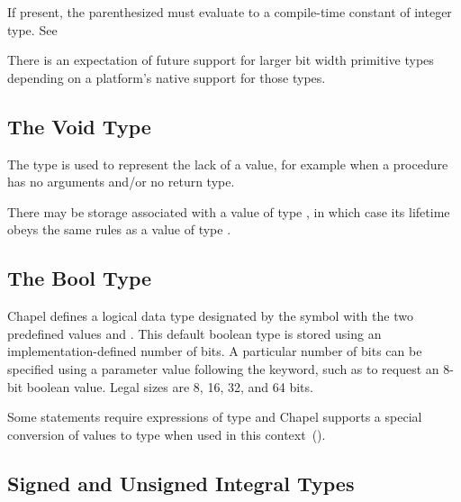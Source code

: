 If present, the parenthesized  must
evaluate to a compile-time constant of integer type.  See~

\begin{openissue}
There is an expectation of future support for larger bit width
primitive types depending on a platform's native support for those
types.
\end{openissue}

\subsection{The Void Type}
\label{The_Void_Type}

The  type is used to represent the lack of a value, for
example when a procedure has no arguments and/or no return type.  

There may be storage associated with a value of type , in which
case its lifetime obeys the same rules as a value of type .

\subsection{The Bool Type}
\label{The_Bool_Type}

Chapel defines a logical data type designated by the symbol
 with the two predefined values  and
.  This default boolean type is stored using an
implementation-defined number of bits.  A particular number of bits
can be specified using a parameter value following the 
keyword, such as  to request an 8-bit boolean value.
Legal sizes are 8, 16, 32, and 64 bits.


Some statements require expressions of  type and Chapel
supports a special conversion of values to  type when used
in this context~().

\subsection{Signed and Unsigned Integral Types}
\label{Signed_and_Unsigned_Integral_Types}

